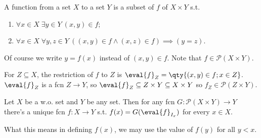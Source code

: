 \begin{note}
    A function from a set $X$ to a set $Y$ is a subset of $f$ of $X \times Y$ s.t.
    \begin{enumerate}
        \item $\forall x \in X \; \exists y \in Y \ (x, y) \in f$;
        \item $\forall x \in X \; \forall y, z \in Y \ ((x, y) \in f \wedge (x, z) \in f) \implies (y = z)$.
    \end{enumerate}

    Of course we write $y = f(x)$ instead of $(x, y) \in f$.
    Note that $f \in \mathcal{P}(X \times Y)$.

    For $Z \subseteq X$, the restriction of $f$ to $Z$ is $\eval{f}_Z = \qty{(x, y) \in f ; x \in Z}$.
    $\eval{f}_Z$ is a fcn $Z \to Y$, so $\eval{f}_Z \subseteq Z \times Y \subseteq X \times Y$ so $f_Z \in \mathcal{P}(Z \times Y)$.
\end{note}

\begin{theorem}
    Let $X$ be a w.o. set and $Y$ be any set.
    Then for any fcn $G \colon \mathcal{P}(X \times Y) \to Y$ there's a unique fcn $f : X \to Y$ s.t. $f(x) = G(\eval{f}_{I_x})$ for every $x \in X$.
\end{theorem}

\begin{remark}
    What this means in defining $f(x)$, we may use the value of $f(y)$ for all $y < x$.
\end{remark}

